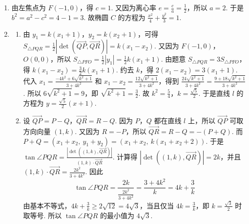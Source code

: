 \documentclass[UTF8,a4paper,oneside,11pt]{ctexbook}
\begin{document}
\begin{solution}
\begin{enumerate}
\item 由左焦点为 \(F(-1,0)\)，得 \(c=1\). 又因为离心率 \(e=\frac{c}{a}=\frac{1}{2}\)，所以 \(a=2\). 于是 \(b^2=a^2-c^2=4-1=3\). 故椭圆 \(C\) 的方程为 \(\frac{x^2}{4}+\frac{y^2}{3}=1\).

\item
\begin{enumerate}
设直线 \(l\) 的方程为 \(y=k\left( x+1 \right)\)（\(k>0\)）. 设 \(P(x_1,y_1)\)，\(Q(x_2,y_2)\)，其中 \(x_1>x_2\). 将直线方程代入椭圆方程，得 \(\frac{x^2}{4}+\frac{k^2\left( x+1 \right)^2}{3}=1\). 化简为 \(\left( 3+4k^2 \right)x^2+8k^2x+4k^2-12=0\).
所以 \(x_1+x_2=-\frac{8k^2}{3+4k^2}\)，\(x_1-x_2=\frac{12\sqrt{k^2+1}}{3+4k^2}\).
因为 \(O\) 是椭圆中心，且直线 \(PO\) 经过原点，所以它与椭圆的另一个交点是 \(P\) 关于原点的对称点，即 \(R(-x_1,-y_1)\).

\item 由 \(y_1=k\left( x_1+1 \right)\)，\(y_2=k\left( x_2+1 \right)\)，可得 \(S_{\triangle PQR}=\frac{1}{2}\left| \det\left( \overrightarrow{QP},\overrightarrow{QR} \right) \right|=k\left( x_1-x_2 \right)\).
又因为 \(F(-1,0)\)，\(O(0,0)\)，所以 \(S_{\triangle PFO}=\frac{1}{2}\left| y_1 \right|=\frac{1}{2}k\left( x_1+1 \right)\).
由题意 \(S_{\triangle PQR}=3S_{\triangle PFO}\)，得 \(k\left( x_1-x_2 \right)=\frac{3}{2}k\left( x_1+1 \right)\). 约去 \(k\)，得 \(2\left( x_1-x_2 \right)=3\left( x_1+1 \right)\). 代入 \(x_1=\frac{-4k^2+6\sqrt{k^2+1}}{3+4k^2}\) 和 \(x_1-x_2=\frac{12\sqrt{k^2+1}}{3+4k^2}\)，得到 \(\frac{24\sqrt{k^2+1}}{3+4k^2}=\frac{9+18\sqrt{k^2+1}}{3+4k^2}\).
所以 \(6\sqrt{k^2+1}=9\)，即 \(\sqrt{k^2+1}=\frac{3}{2}\). 故 \(k^2=\frac{5}{4}\)，\(k=\frac{\sqrt{5}}{2}\). 于是直线 \(l\) 的方程为 \(y=\frac{\sqrt{5}}{2}\left( x+1 \right)\).

\item 设 \(\overrightarrow{QP}=P-Q\)，\(\overrightarrow{QR}=R-Q\). 因为 \(P\)，\(Q\) 都在直线 \(l\) 上，所以 \(\overrightarrow{QP}\) 可取方向向量 \(\left( 1,k \right)\). 又因为 \(R=-P\)，所以 \(\overrightarrow{QR}=R-Q=-(P+Q)\). 而 \(P+Q=\left( x_1+x_2,\ y_1+y_2 \right)=\left( x_1+x_2,\ k\left( x_1+x_2+2 \right) \right)\).
于是 \(\tan \angle PQR=\frac{\left| \det\left( \left( 1,k \right),\overrightarrow{QR} \right) \right|}{\left( 1,k \right)\cdot \overrightarrow{QR}}\).
计算得 \(\left| \det\left( \left( 1,k \right),\overrightarrow{QR} \right) \right|=2k\)，并且 \(\left( 1,k \right)\cdot \overrightarrow{QR}=\frac{2k^2}{3+4k^2}\).
因此
\[
\tan \angle PQR=\frac{2k}{\frac{2k^2}{3+4k^2}}=\frac{3+4k^2}{k}=4k+\frac{3}{k}
\]
由基本不等式，\(4k+\frac{3}{k}\ge 2\sqrt{12}=4\sqrt{3}\)，当且仅当 \(4k=\frac{3}{k}\)，即 \(k=\frac{\sqrt{3}}{2}\) 时取等号.
所以 \(\tan \angle PQR\) 的最小值为 \(4\sqrt{3}\).
\end{enumerate}
\end{enumerate}
\end{solution}
\end{document}
